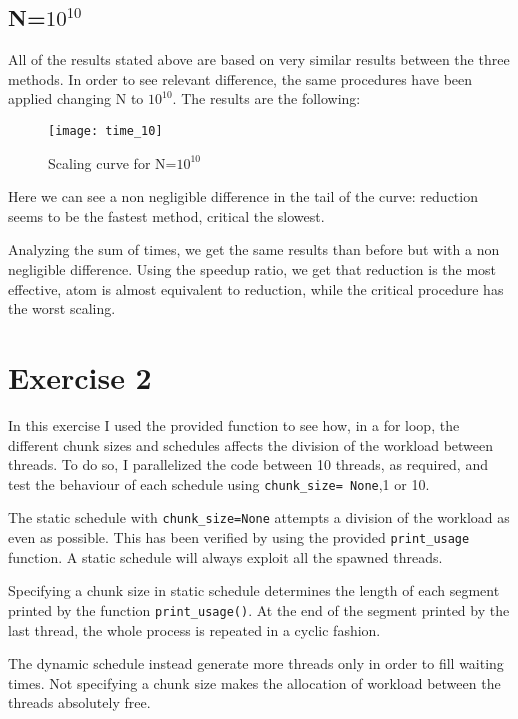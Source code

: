 \documentclass[10pt,a4paper]{article}
\begin{document}
\subsection{N=$10^{10}$}

All of the results stated above are based on very similar results between the three methods. In order to see relevant difference, the same procedures have been applied changing N to $10^{10}$. The results are the following:

\begin{figure}[h!]
	\centering
	\texttt{[image: time\_10]}
	\caption*{Scaling curve for N=$10^{10}$}
	\label{fig:time10}
\end{figure}

Here we can see a non negligible difference in the tail of the curve: reduction seems to be the fastest method, critical the slowest.

Analyzing the sum of times, we get the same results than before but with a non negligible difference. Using the speedup ratio, we get that reduction is the most effective, atom is almost equivalent to reduction, while the critical procedure has the worst scaling.

\section{Exercise 2}

In this exercise I used the provided function to see how, in a for loop, the different chunk sizes and schedules affects the division of the workload between threads. To do so, I parallelized the code between 10 threads, as required, and test the behaviour of each schedule using \texttt{chunk\_size= None},1 or 10.

The static schedule with \texttt{chunk\_size=None} attempts a division of the workload as even as possible. This has been verified by using the provided \texttt{print\_usage} function. A static schedule will always exploit all the spawned threads.

Specifying a chunk size in static schedule determines the length of each segment printed by the function \texttt{print\_usage()}. At the end of the segment printed by the last thread, the whole process is repeated in a cyclic fashion.

The dynamic schedule instead generate more threads only in order to fill waiting times. Not specifying a chunk size makes the allocation of workload between the threads absolutely free.
\end{document}
